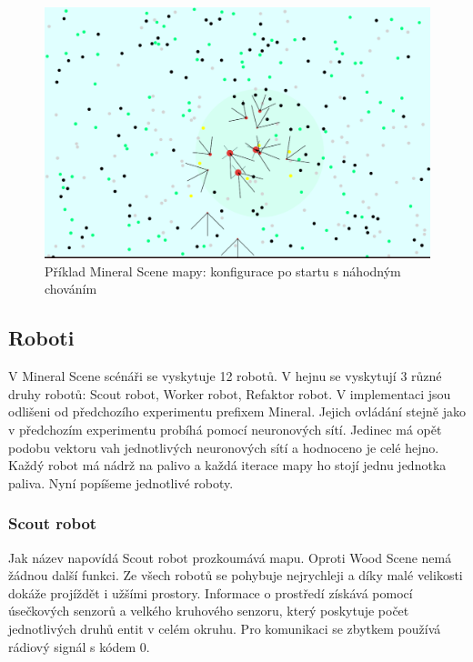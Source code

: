 \begin{figure}[h]\centering
	\includegraphics[width=\columnwidth]{../img/MineralMap/MineralRandom.png}
	\caption{Příklad Mineral Scene mapy: konfigurace po startu s  náhodným chováním}
	\label{obr04:MineralSceneRandomStart}
\end{figure}
\clearpage 
\subsection*{Roboti}
V Mineral Scene scénáři se vyskytuje 12 robotů. V hejnu se vyskytují 3 různé druhy robotů: Scout robot, Worker robot, Refaktor robot. V implementaci jsou odlišeni od předchozího experimentu prefixem Mineral. Jejich ovládání stejně jako v předchozím experimentu probíhá pomocí neuronových sítí. Jedinec má opět podobu vektoru vah jednotlivých neuronových sítí a hodnoceno je celé hejno. Každý robot má nádrž na palivo a každá iterace mapy ho stojí jednu jednotka paliva. Nyní popíšeme jednotlivé roboty.
\subsubsection{Scout robot}
Jak název napovídá Scout robot prozkoumává mapu. Oproti Wood Scene nemá žádnou další funkci. Ze všech robotů se pohybuje nejrychleji a díky malé velikosti dokáže projíždět i užšími prostory. Informace o prostředí získává pomocí úsečkových senzorů a velkého kruhového senzoru, který poskytuje počet jednotlivých druhů entit v celém okruhu. Pro komunikaci se zbytkem používá rádiový signál s kódem 0. 
\par  

